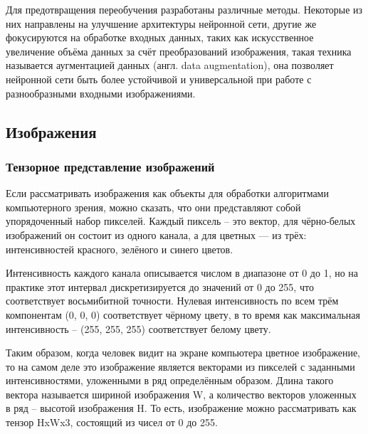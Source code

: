 \documentclass[14pt, russian]{scrartcl}
\begin{document}
Для предотвращения переобучения разработаны различные методы. Некоторые из них направлены на улучшение архитектуры нейронной сети, другие же фокусируются на обработке входных данных, таких как искусственное увеличение объёма данных за счёт преобразований изображения, такая техника называется аугментацией данных (англ. data augmentation), она позволяет нейронной сети быть более устойчивой и универсальной при работе с разнообразными входными изображениями.

\subsection{Изображения}

\subsubsection{Тензорное представление изображений}
Если рассматривать изображения как объекты для обработки алгоритмами компьютерного зрения, можно сказать, что они представляют собой упорядоченный набор пикселей. Каждый пиксель -- это вектор, для чёрно-белых изображений он состоит из одного канала, а для цветных — из трёх: интенсивностей красного, зелёного и синего цветов\cite{yandex}.

Интенсивность каждого канала описывается числом в диапазоне от 0 до 1, но на практике этот интервал дискретизируется до значений от 0 до 255, что соответствует восьмибитной точности. Нулевая интенсивность по всем трём компонентам (0, 0, 0) соответствует чёрному цвету, в то время как максимальная интенсивность -- (255, 255, 255) соответствует белому цвету.

Таким образом, когда человек видит на экране компьютера цветное изображение, то на самом деле это изображение является векторами из пикселей с заданными интенсивностями, уложенными в ряд определённым образом. Длина такого вектора называется шириной изображения W, а количество векторов уложенных в ряд -- высотой изображения H. То есть, изображение можно рассматривать как тензор HxWx3, состоящий из чисел от 0 до 255.
\end{document}
